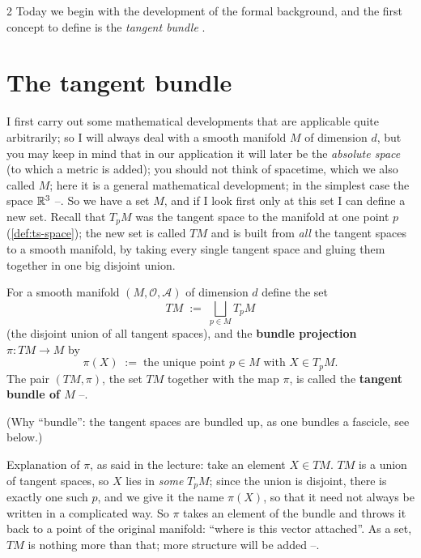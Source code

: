 \begin{paracol}{2}
Today we begin with the development of the formal background, and the first concept to define is the \emph{tangent bundle} .

\section{The tangent bundle}\label{sec:lag-tb}

I first carry out some mathematical developments that are applicable quite arbitrarily; so I will always deal with a smooth manifold $M$ of dimension $d$, but you may keep in mind that in our application it will later be the \emph{absolute space} (to which a metric is added); you should not think of spacetime, which we also called $M$; here it is a general mathematical development; in the simplest case the space $\mathbb{R}^3$ --.
So we have a set $M$, and if I look first only at this set I can define a new set. Recall that $T_pM$ was the tangent space to the manifold at one point $p$ (\cref{def:ts-space}); the new set is called $TM$ and is built from \emph{all} the tangent spaces to a smooth manifold, by taking every single tangent space and gluing them together in one big disjoint union.

\begin{definition}\label{def:lag-tb}
For a smooth manifold $(M,\mathcal O,\mathcal A)$ of dimension $d$ define the set
\begin{equation}\label{eq:lag-tb}
  TM\;:=\;\bigsqcup_{p\in M}T_pM
\end{equation}
(the disjoint union of all tangent spaces), and the \textbf{bundle projection} $\pi\colon TM\to M$ by
\begin{equation}\label{eq:lag-pi}
  \pi(X)\;:=\;\text{the unique point }p\in M\text{ with }X\in T_pM .
\end{equation}
The pair $(TM,\pi)$, the set $TM$ together with the map $\pi$, is called the \textbf{tangent bundle of $M$} --.
\end{definition}
(Why ``bundle'': the tangent spaces are bundled up, as one bundles a fascicle, see below.)

Explanation of $\pi$, as said in the lecture: take an element $X\in TM$. $TM$ is a union of tangent spaces, so $X$ lies in \emph{some} $T_pM$; since the union is disjoint, there is exactly one such $p$, and we give it the name $\pi(X)$, so that it need not always be written in a complicated way. So $\pi$ takes an element of the bundle and throws it back to a point of the original manifold: ``where is this vector attached''. As a set, $TM$ is nothing more than that; more structure will be added --.


\end{paracol}
